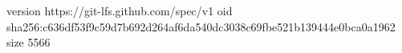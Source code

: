 version https://git-lfs.github.com/spec/v1
oid sha256:c636df53f9c59d7b692d264af6da540dc3038c69fbe521b139444e0bca0a1962
size 5566
